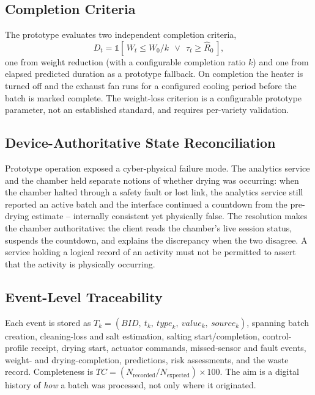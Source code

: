 \documentclass[conference]{IEEEtran}
\begin{document}
\subsection{Completion Criteria}
The prototype evaluates two independent completion criteria,
\begin{equation}
D_{t} = \mathbb{1}\!\left[\,W_{t} \le W_{0}/k\ \ \vee\ \ \tau_{t} \ge
\hat{R}_{0}\,\right],\label{eq10}
\end{equation}
one from weight reduction (with a configurable completion ratio $k$) and
one from elapsed predicted duration as a prototype fallback. On completion
the heater is turned off and the exhaust fan runs for a configured cooling
period before the batch is marked complete. The weight-loss criterion is a
configurable prototype parameter, not an established standard, and requires
per-variety validation.

\subsection{Device-Authoritative State Reconciliation}
Prototype operation exposed a cyber-physical failure mode. The analytics
service and the chamber held separate notions of whether drying was
occurring: when the chamber halted through a safety fault or lost link, the
analytics service still reported an active batch and the interface
continued a countdown from the pre-drying estimate -- internally consistent
yet physically false. The resolution makes the chamber authoritative: the
client reads the chamber's live session status, suspends the countdown, and
explains the discrepancy when the two disagree. A service holding a logical
record of an activity must not be permitted to assert that the activity is
physically occurring.

\subsection{Event-Level Traceability}
Each event is stored as $T_{k}=(BID,\ t_{k},\ \textit{type}_{k},\
\textit{value}_{k},\ \textit{source}_{k})$, spanning batch creation,
cleaning-loss and salt estimation, salting start/completion, control-profile
receipt, drying start, actuator commands, missed-sensor and fault events,
weight- and drying-completion, predictions, risk assessments, and the waste
record. Completeness is $TC = (N_{\text{recorded}}/N_{\text{expected}})
\times 100$. The aim is a digital history of \emph{how} a batch was
processed, not only where it originated.
\end{document}
